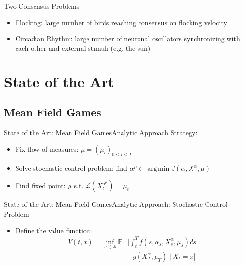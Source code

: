 \documentclass{beamer}
\DeclareMathOperator*{\argmin}{arg\,min}
\begin{document}
\begin{frame}{Two Consensus Problems}
	\begin{itemize}
		\item {
			Flocking: large number of birds reaching consensus on flocking velocity
		}
		\item {
			Circadian Rhythm: large number of neuronal oscillators synchronizing with each other and external stimuli (e.g. the sun)
		}
	\end{itemize}
\end{frame}

\section{State of the Art}

\subsection{Mean Field Games}

\begin{frame}{State of the Art: Mean Field Games}{Analytic Approach}
	Strategy:
	\begin{itemize}
				\item {
					Fix flow of measures: $\mu=(\mu_t)_{0 \leq t \leq T}$
				}
				\item {
					Solve stochastic control problem: find $\alpha^{\mu} \in \argmin J(\alpha,X^{\alpha},\mu)$
				}
				\item {
					Find fixed point: $\mu$ s.t. $\mathcal{L}(X_t^{\alpha^{\mu}})=\mu_t$
				}
	\end{itemize}
\end{frame}
		
\begin{frame}{State of the Art: Mean Field Games}{Analytic Approach: Stochastic Control Problem}
	\begin{itemize}
				\item {
					Define the value function:
					\begin{equation}
					\begin{split}
					V(t,x)=\inf_{\alpha \in \mathbb{A}}\mathbb{E}&\Bigg[\int_{t}^{T}f(s,\alpha_s,X_s^{\alpha},\mu_s)ds \\
					&+g(X_T^{\alpha},\mu_T) \mid X_t = x \Bigg]
					\end{split}
					\end{equation}
				}
			\end{itemize}
\end{frame}
		
\end{document}
